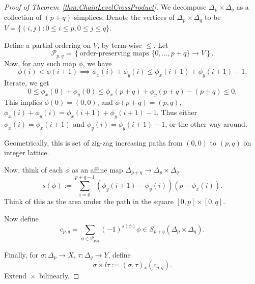 \begin{proof}[Proof of Theorem~\ref{thm:ChainLevelCrossProduct}]
	We decompose $\Delta_p \times \Delta_q$ as a collection of $(p + q)$-simplices. Denote the vertices of $\Delta_p \times \Delta_q$ to be $V = \{(i, j): 0 \le i\le p, 0\le j\le q\} $.

	Define a partial ordering on $V$, by term-wise $\le $. Let
	\[
		\mathcal{P}_{p, q} = \left\{\text{order-preserving maps } \{0, ..., p + q\}  \to V\right\} 
	.\] 
	Now, for any such map $\phi$, we have
	\[
		\phi(i) < \phi(i + 1) \implies \phi_x(i) + \phi_y(i)
		\le \phi_x(i + 1) + \phi_y (i + 1) - 1
	.\] 
	Iterate, we get
	\[
		0\le \phi_x(0) + \phi_y(0) \le  \phi_x(p + q) + \phi_y(p + q) - (p + q) \le 0
	.\] 
	This implies $\phi(0) = (0,0)$, and $\phi(p + q) = (p, q)$, $\phi_x(i) + \phi_y(i) = \phi_x(i+1) + \phi_y(i+1)-1$. Thus either $\phi_x(i) = \phi_x(i+1)$ and $\phi_y(i) = \phi_y( i + 1) - 1$, or the other way around.

	Geometrically, this is set of zig-zag increasing paths from $(0,0)$ to $(p, q)$ on integer lattice.

	Now, think of each $\phi$ as an affine map $\Delta_{p + q} \to  \Delta_p \times \Delta_q$.
	\[
		s(\phi):= \sum_{i = 0}^{p + q - 1} \left( \phi_y(i + 1) - \phi_y(i) \right) \left( p - \phi_x(i) \right) 
	.\] 
	Think of this as the area under the path in the square $[0,p] \times [0,q]$.

	Now define
	\[
		c_{p, q} = \sum_{\phi \in \mathcal{P}_{p, q}} (-1)^{s(\phi)} \phi \in S_{p + q}\left( \Delta_p \times \Delta_q \right) 
	.\] 

	Finally, for $\sigma: \Delta_p \to X$, $\tau: \Delta_q \to Y$, define
\[
	\sigma \tilde \times l\tau := \left( \sigma, \tau \right) _* (c_{p, q})
.\] 
Extend $\tilde \times $ bilinearly.

\end{proof}

